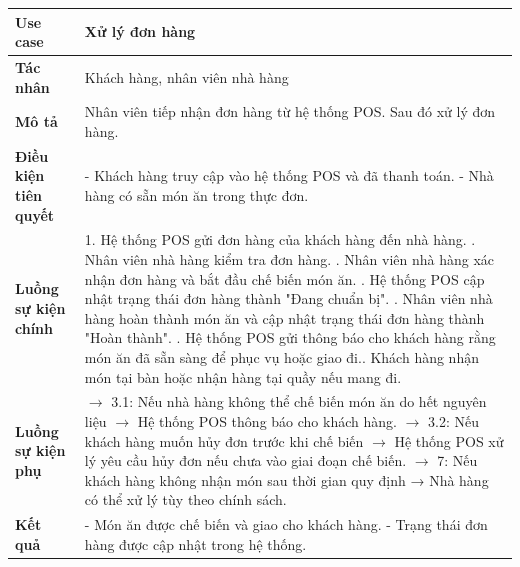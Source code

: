 \documentclass[a4paper]{article}
\begin{document}
\begin{table}[H]
    \small
    \centering
    \renewcommand{\arraystretch}{1.5} %
    \setlength{\arrayrulewidth}{0.5mm} %
    \setlength{\tabcolsep}{5pt} %
    \begin{tabularx}{\textwidth}{|l|X|}
        \hline
        \textbf{Use case}             & Xử lý đơn hàng                                                                     \\
        \hline
        \textbf{Tác nhân}             & Khách hàng, nhân viên nhà hàng                                                     \\
        \hline
        \textbf{Mô tả}                & Nhân viên tiếp nhận đơn hàng từ hệ thống POS. Sau đó xử lý đơn hàng.               \\
        \hline
        \textbf{Điều kiện tiên quyết} &
        - Khách hàng truy cập vào hệ thống POS và đã thanh toán. \newline
        - Nhà hàng có sẵn món ăn trong thực đơn.                                                                           \\
        \hline
        \textbf{Luồng sự kiện chính}  &
        1. Hệ thống POS gửi đơn hàng của khách hàng đến nhà hàng. \newline
        2. Nhân viên nhà hàng kiểm tra đơn hàng. \newline
        3. Nhân viên nhà hàng xác nhận đơn hàng và bắt đầu chế biến món ăn. \newline
        4. Hệ thống POS cập nhật trạng thái đơn hàng thành "Đang chuẩn bị".  \newline
        5. Nhân viên nhà hàng hoàn thành món ăn và cập nhật trạng thái đơn hàng thành "Hoàn thành". \newline
        6. Hệ thống POS gửi thông báo cho khách hàng rằng món ăn đã sẵn sàng để phục vụ hoặc giao đi.\newline
        7. Khách hàng nhận món tại bàn hoặc nhận hàng tại quầy nếu mang đi.                                                \\
        \hline
        \textbf{Luồng sự kiện phụ}    &
        $\rightarrow$ 3.1: Nếu nhà hàng không thể chế biến món ăn do hết nguyên liệu $\rightarrow$ Hệ thống POS thông báo cho khách hàng. \newline
        $\rightarrow$ 3.2: Nếu khách hàng muốn hủy đơn trước khi chế biến $\rightarrow$ Hệ thống POS xử lý yêu cầu hủy đơn nếu chưa vào giai đoạn chế biến. \newline
        $\rightarrow$ 7: Nếu khách hàng không nhận món sau thời gian quy định → Nhà hàng có thể xử lý tùy theo chính sách. \\
        \hline
        \textbf{Kết quả}              &
        - Món ăn được chế biến và giao cho khách hàng. \newline
        - Trạng thái đơn hàng được cập nhật trong hệ thống.                                                                \\
        \hline
    \end{tabularx}


\end{table}
\end{document}
